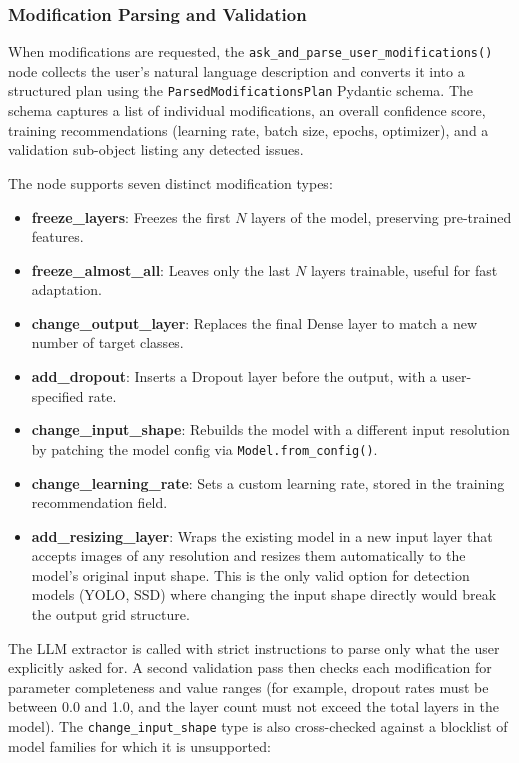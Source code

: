 \subsubsection{Modification Parsing and Validation}
\label{sec:mod_parsing}

When modifications are requested, the \texttt{ask\_\allowbreak and\_\allowbreak parse\_\allowbreak user\_\allowbreak modifications()} node collects the user's natural language description and converts it into a structured plan using the \texttt{ParsedModificationsPlan} Pydantic schema. The schema captures a list of individual modifications, an overall confidence score, training recommendations (learning rate, batch size, epochs, optimizer), and a validation sub-object listing any detected issues.

The node supports seven distinct modification types:

\begin{itemize}[noitemsep, topsep=4pt]
  \item \textbf{freeze\_layers}: Freezes the first $N$ layers of the model, preserving pre-trained features.
  \item \textbf{freeze\_almost\_all}: Leaves only the last $N$ layers trainable, useful for fast adaptation.
  \item \textbf{change\_output\_layer}: Replaces the final Dense layer to match a new number of target classes.
  \item \textbf{add\_dropout}: Inserts a Dropout layer before the output, with a user-specified rate.
  \item \textbf{change\_input\_shape}: Rebuilds the model with a different input resolution by patching the model config via \texttt{Model.from\_config()}.
  \item \textbf{change\_learning\_rate}: Sets a custom learning rate, stored in the training recommendation field.
  \item \textbf{add\_resizing\_layer}: Wraps the existing model in a new input layer that accepts images of any resolution and resizes them automatically to the model's original input shape. This is the only valid option for detection models (YOLO, SSD) where changing the input shape directly would break the output grid structure.
\end{itemize}

The LLM extractor is called with strict instructions to parse only what the user explicitly asked for. A second validation pass then checks each modification for parameter completeness and value ranges (for example, dropout rates must be between 0.0 and 1.0, and the layer count must not exceed the total layers in the model). The \texttt{change\_\allowbreak input\_\allowbreak shape} type is also cross-checked against a blocklist of model families for which it is unsupported:

